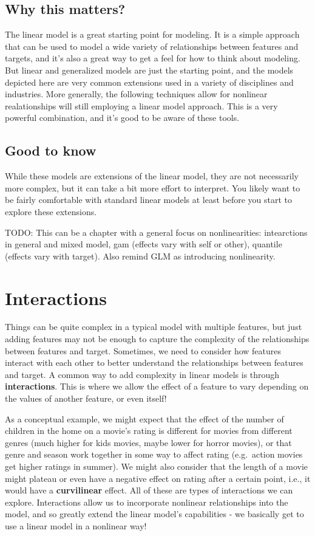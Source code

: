 \documentclass[
  letterpaper,
]{krantz}
\begin{document}
\subsection{Why this matters?}\label{sec-lm-extend-why}

The linear model is a great starting point for modeling. It is a simple
approach that can be used to model a wide variety of relationships
between features and targets, and it's also a great way to get a feel
for how to think about modeling. But linear and generalized models are
just the starting point, and the models depicted here are very common
extensions used in a variety of disciplines and industries. More
generally, the following techniques allow for nonlinear realationships
will still employing a linear model approach. This is a very powerful
combination, and it's good to be aware of these tools.

\subsection{Good to know}\label{sec-lm-extend-good}

While these models are extensions of the linear model, they are not
necessarily more complex, but it can take a bit more effort to
interpret. You likely want to be fairly comfortable with standard linear
models at least before you start to explore these extensions.

TODO: This can be a chapter with a general focus on nonlinearities:
intearctions in general and mixed model, gam (effects vary with self or
other), quantile (effects vary with target). Also remind GLM as
introducing nonlinearity.

\section{Interactions}\label{sec-lm-interactions}

Things can be quite complex in a typical model with multiple features,
but just adding features may not be enough to capture the complexity of
the relationships between features and target. Sometimes, we need to
consider how features interact with each other to better understand the
relationships between features and target. A common way to add
complexity in linear models is through \textbf{interactions}. This is
where we allow the effect of a feature to vary depending on the values
of another feature, or even itself!

As a conceptual example, we might expect that the effect of the number
of children in the home on a movie's rating is different for movies from
different genres (much higher for kids movies, maybe lower for horror
movies), or that genre and season work together in some way to affect
rating (e.g.~action movies get higher ratings in summer). We might also
consider that the length of a movie might plateau or even have a
negative effect on rating after a certain point, i.e., it would have a
\textbf{curvilinear} effect. All of these are types of interactions we
can explore. Interactions allow us to incorporate nonlinear
relationships into the model, and so greatly extend the linear model's
capabilities - we basically get to use a linear model in a nonlinear
way!
\end{document}
